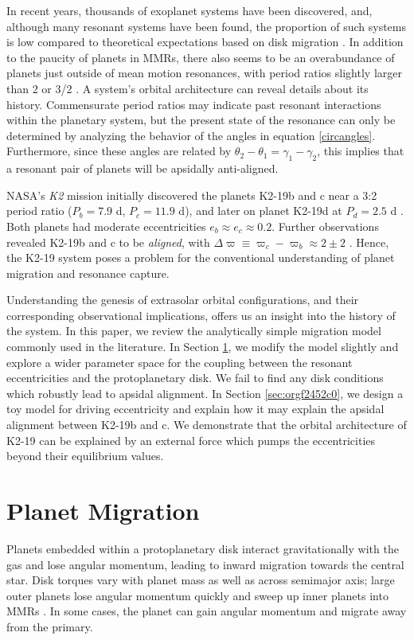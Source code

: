 \documentclass{mnras}
\begin{document}
In recent years, thousands of exoplanet systems have been discovered,
and, although many resonant systems have been found, the proportion of
such systems is low compared to theoretical expectations based on disk
migration \cite{fabrycky_architecture_2014}.  In addition to the paucity
of planets in MMRs, there also seems to be an overabundance of planets
just outside of mean motion resonances, with period ratios slightly
larger than 2 or 3/2
\cite{fabrycky_architecture_2014,choksi_sub-neptune_2020}.
A system's orbital architecture can reveal details about its history.
Commensurate period ratios may indicate past resonant interactions
within the planetary system, but the present state of the resonance
can only be determined by analyzing the behavior of the angles in
equation \eqref{circangles}.  Furthermore, since these angles are
related by \(\theta_2-\theta_1=\gamma_1-\gamma_2\), this implies that a
resonant pair of planets will be apsidally anti-aligned.

NASA's \emph{K2} mission initially discovered the planets K2-19b and c
near a 3:2 period ratio (\(P_b=7.9\) d, \(P_c=11.9\) d), and later on
planet K2-19d at \(P_d=2.5\) d
\cite{howell14_k2_mission,armstrong15_one_closes_exopl_pairs_to,sinukoff16_eleven_multip_system_fromk_masses}.
Both planets had moderate eccentricities \(e_b\approx e_c\approx 0.2\).
Further observations revealed K2-19b and c to be \emph{aligned}, with
\(\Delta\varpi\equiv \varpi_c-\varpi_b \approx 2\pm 2\)
\cite{petigura_k2-19b_2020}.  Hence, the K2-19 system poses a problem
for the conventional understanding of planet migration and resonance
capture.

Understanding the genesis of extrasolar orbital configurations, and
their corresponding observational implications, offers us an insight
into the history of the system.  In this paper, we review the
analytically simple migration model commonly used in the literature.
In Section \ref{sec:orgfdffa6d}, we modify the model slightly and explore
a wider parameter space for the coupling between the resonant
eccentricities and the protoplanetary disk. We fail to find any disk
conditions which robustly lead to apsidal alignment.  In Section
\ref{sec:orgf2452c0}, we design a toy model for driving eccentricity and
explain how it may explain the apsidal alignment between K2-19b and
c. We demonstrate that the orbital architecture of K2-19 can be
explained by an external force which pumps the eccentricities beyond
their equilibrium values.

\section{Planet Migration}
\label{sec:orgfdffa6d}
Planets embedded within a protoplanetary disk interact gravitationally
with the gas and lose angular momentum, leading to inward migration
towards the central star.  Disk torques vary with planet mass as well
as across semimajor axis; large outer planets lose angular momentum
quickly and sweep up inner planets into MMRs
\cite{tanaka_three-dimensional_2004,xu_migration_2018}.  In some
cases, the planet can gain angular momentum and migrate away from the
primary.
\end{document}
